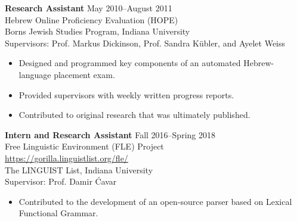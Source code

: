 \begin{singlespace}
\vspace{8pt}
\noindent\textbf{Research Assistant} \hfill May 2010--August 2011 \\
Hebrew Online Proficiency Evaluation (HOPE) \\
Borns Jewish Studies Program, Indiana University  \\
Supervisors: Prof. Markus Dickinson, Prof. Sandra K\"ubler, and Ayelet Weiss
\begin{itemize} %
\item Designed and programmed key components of an automated Hebrew-language placement exam. 
\item Provided supervisors with weekly written progress reports.
\item Contributed to original research that was ultimately published.
\end{itemize}
\noindent\textbf{Intern and Research Assistant} \hfill Fall 2016--Spring 2018 \\
Free Linguistic Environment (FLE) Project \\
\url{https://gorilla.linguistlist.org/fle/} \\
The LINGUIST List, Indiana University \\
Supervisor: Prof. Damir \'Cavar
\begin{itemize} %
\item Contributed to the development of an open-source parser based on Lexical Functional Grammar. %

\end{itemize}
\end{singlespace}
